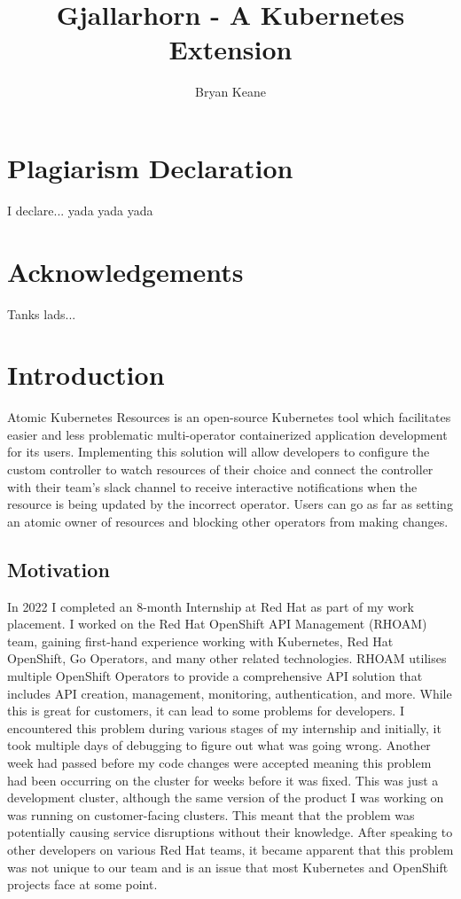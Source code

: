\documentclass{article}
\title{Gjallarhorn - A Kubernetes Extension}
\author{Bryan Keane}
\begin{document}
\maketitle
\newpage

\tableofcontents
\newpage

\listoffigures
\newpage

\listoftables
\newpage

\section{Plagiarism Declaration}
I declare... yada yada yada
\section{Acknowledgements}
Tanks lads... 

\section{Introduction}
Atomic Kubernetes Resources is an open-source Kubernetes tool which facilitates easier and less problematic multi-operator containerized application development for its users. Implementing this solution will allow developers to configure the custom controller to watch resources of their choice and connect the controller with their team’s slack channel to receive interactive notifications when the resource is being updated by the incorrect operator. Users can go as far as setting an atomic owner of resources and blocking other operators from making changes.

\subsection{Motivation}
In 2022 I completed an 8-month Internship at Red Hat as part of my work placement. I worked on the Red Hat OpenShift API Management (RHOAM) team, gaining first-hand experience working with Kubernetes, Red Hat OpenShift, Go Operators, and many other related technologies. RHOAM utilises multiple OpenShift Operators to provide a comprehensive API solution that includes API creation, management, monitoring, authentication, and more. While this is great for customers, it can lead to some problems for developers. 
I encountered this problem during various stages of my internship and initially, it took multiple days of debugging to figure out what was going wrong. Another week had passed before my code changes were accepted meaning this problem had been occurring on the cluster for weeks before it was fixed. This was just a development cluster, although the same version of the product I was working on was running on customer-facing clusters. This meant that the problem was potentially causing service disruptions without their knowledge. After speaking to other developers on various Red Hat teams, it became apparent that this problem was not unique to our team and is an issue that most Kubernetes and OpenShift projects face at some point.
\end{document}
